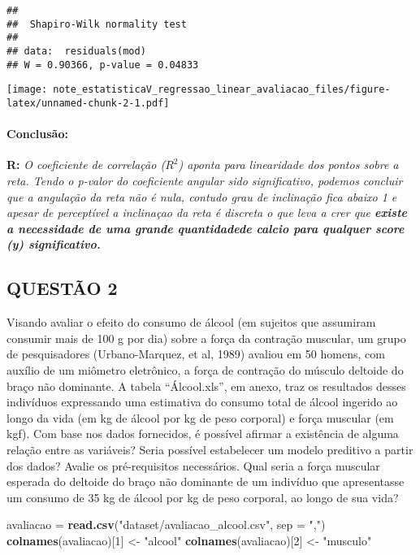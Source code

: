 \documentclass[]{article}
\newenvironment{Shaded}{\begin{snugshade}}{\end{snugshade}}
\newcommand{\KeywordTok}[1]{\textcolor[rgb]{0.13,0.29,0.53}{\textbf{#1}}}
\newcommand{\DataTypeTok}[1]{\textcolor[rgb]{0.13,0.29,0.53}{#1}}
\newcommand{\DecValTok}[1]{\textcolor[rgb]{0.00,0.00,0.81}{#1}}
\newcommand{\StringTok}[1]{\textcolor[rgb]{0.31,0.60,0.02}{#1}}
\newcommand{\NormalTok}[1]{#1}
\let\oldparagraph\paragraph
\renewcommand{\paragraph}[1]{\oldparagraph{#1}\mbox{}}
\begin{document}
\begin{verbatim}
## 
##  Shapiro-Wilk normality test
## 
## data:  residuals(mod)
## W = 0.90366, p-value = 0.04833
\end{verbatim}

\texttt{[image: note\_estatisticaV\_regressao\_linear\_avaliacao\_files/figure-latex/unnamed-chunk-2-1.pdf]}

\paragraph{Conclusão:}\label{conclusao}

\textbf{R:} \emph{O coeficiente de correlação (\(R^2\)) aponta para
linearidade dos pontos sobre a reta. Tendo o p-valor do coeficiente
angular sido significativo, podemos concluir que a angulação da reta não
é nula, contudo grau de inclinação fica abaixo 1 e apesar de perceptível
a inclinaçao da reta é discreta o que leva a crer que \textbf{existe a
necessidade de uma grande quantidadede calcio para qualquer score (y)
significativo.} }

\subsection{QUESTÃO 2}\label{questao-2}

Visando avaliar o efeito do consumo de álcool (em sujeitos que assumiram
consumir mais de 100 g por dia) sobre a força da contração muscular, um
grupo de pesquisadores (Urbano-Marquez, et al, 1989) avaliou em 50
homens, com auxílio de um miômetro eletrônico, a força de contração do
músculo deltoide do braço não dominante. A tabela ``Álcool.xls'', em
anexo, traz os resultados desses indivíduos expressando uma estimativa
do consumo total de álcool ingerido ao longo da vida (em kg de álcool
por kg de peso corporal) e força muscular (em kgf). Com base nos dados
fornecidos, é possível afirmar a existência de alguma relação entre as
variáveis? Seria possível estabelecer um modelo preditivo a partir dos
dados? Avalie os pré-requisitos necessários. Qual seria a força muscular
esperada do deltoide do braço não dominante de um indivíduo que
apresentasse um consumo de 35 kg de álcool por kg de peso corporal, ao
longo de sua vida?

\begin{Shaded}
\begin{Highlighting}[]
\NormalTok{avaliacao =}\StringTok{ }\KeywordTok{read.csv}\NormalTok{(}\StringTok{"dataset/avaliacao_alcool.csv"}\NormalTok{, }\DataTypeTok{sep =} \StringTok{","}\NormalTok{)}
\KeywordTok{colnames}\NormalTok{(avaliacao)[}\DecValTok{1}\NormalTok{] <-}\StringTok{ "alcool"}
\KeywordTok{colnames}\NormalTok{(avaliacao)[}\DecValTok{2}\NormalTok{] <-}\StringTok{ "musculo"}
\end{Highlighting}
\end{Shaded}
\end{document}
